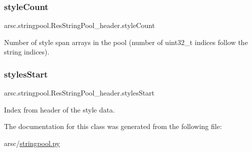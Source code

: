 \subsubsection{\texorpdfstring{style\+Count}{styleCount}}
{\footnotesize\ttfamily arsc.\+stringpool.\+Res\+String\+Pool\+\_\+header.\+style\+Count}



Number of style span arrays in the pool (number of uint32\+\_\+t indices follow the string indices). 

\mbox{\label{classarsc_1_1stringpool_1_1ResStringPool__header_a6b4e18bf84dea343ef091b7b7b6eda5a}} 
\subsubsection{\texorpdfstring{styles\+Start}{stylesStart}}
{\footnotesize\ttfamily arsc.\+stringpool.\+Res\+String\+Pool\+\_\+header.\+styles\+Start}



Index from header of the style data. 



The documentation for this class was generated from the following file\+:\begin{DoxyCompactItemize}
\item 
arsc/\mbox{\hyperlink{stringpool_8py}{stringpool.\+py}}\end{DoxyCompactItemize}
